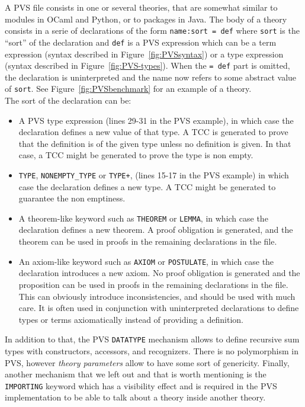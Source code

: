 \documentclass[12pt,a4paper]{article}
\newcommand{\cl}[1]{\texttt{#1}}
\begin{document}
A PVS file consists in one or several theories, that are somewhat similar to modules in OCaml and Python, or to packages in Java. The body of a theory consists in a serie of declarations of the form \cl{name:sort = def} where \cl{sort} is the “sort” of the declaration and \cl{def} is a PVS expression which can be a term expression (syntax described in Figure~\ref{fig:PVSsyntax}) or a type expression (syntax described in Figure~\ref{fig:PVS-types}). When the \cl{= def} part is omitted, the declaration is uninterpreted and the name now refers to some abstract value of \cl{sort}. See Figure~\ref{fig:PVSbenchmark} for an example of a theory. \\

The sort of the declaration can be:
\begin{itemize}
\item A PVS type expression (lines 29-31 in the PVS example), in which case the declaration defines a new value of that type. A TCC is generated to prove that the definition is of the given type unless no definition is given. In that case, a TCC might be generated to prove the type is non empty.
\item \cl{TYPE}, \cl{NONEMPTY\_TYPE} or \cl{TYPE+}, (lines 15-17 in the PVS example) in which case the declaration defines a new type. A TCC might be generated to guarantee the non emptiness.
\item A theorem-like keyword such as \cl{THEOREM} or \cl{LEMMA}, in which case the declaration defines a new theorem. A proof obligation is generated, and the theorem can be used in proofs in the remaining declarations
in the file.
\item An axiom-like keyword such as \cl{AXIOM} or \cl{POSTULATE}, in which case the declaration introduces a new axiom. No proof obligation is generated and the proposition can be used in proofs in the remaining declarations in the file.
This can obviously introduce inconsistencies, and should be used with much care. It is often used in conjunction with uninterpreted declarations to define types or terms axiomatically instead of providing a definition.
\end{itemize}

In addition to that, the PVS \cl{DATATYPE} mechanism allows to define recursive sum types with constructors, accessors, and recognizers. There is no polymorphism in PVS, however \emph{theory parameters} allow to have some sort of genericity. Finally, another mechanism that we left out and that is worth mentioning is the \cl{IMPORTING} keyword which has a visibility effect and is required in the PVS implementation to be able to talk about a theory inside another theory. \\
\end{document}
